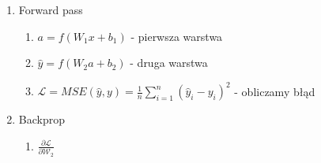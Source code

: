 \documentclass{../notatki}
\begin{document}
\begin{enumerate}
  \item Forward pass
    \begin{enumerate}
      \item $a = f(W_1x + b_1)$ - pierwsza warstwa
      \item $\hat{y} = f(W_2a + b_2)$ - druga warstwa
      \item $\mathcal{L} = MSE(\hat{y}, y) = \frac{1}{n} \sum_{i=1}^{n}
        (\hat{y}_i - y_i)^2$ - obliczamy błąd
    \end{enumerate}
  \item Backprop
    \begin{enumerate}
      \item $\frac{\partial \mathcal{L}}{\partial \mathcal{W_2}}$
    \end{enumerate}
\end{enumerate}
\end{document}
